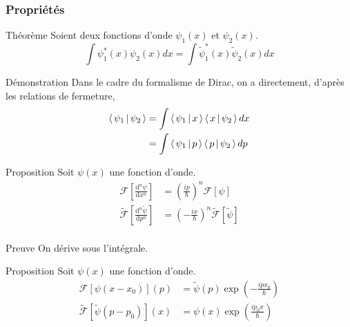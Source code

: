         \subsubsection{Propriétés}

        \begin{omed}{Théorème}
            Soient deux fonctions d’onde $\psi_1(x)$ et $\psi_2(x)$.
            \[ \int \psi_1^*(x) \psi_2(x) dx = \int \tilde{\psi}_1^*(x) \tilde{\psi}_2(x) dx \]
        \end{omed}

        \begin{demo}{Démonstration}
            Dans le cadre du formalisme de Dirac, on a directement, d’après les relations de fermeture,
            \begin{align*}
                \left< \, \psi_1 \, \middle| \, \psi_2 \, \right> &= \int \left< \, \psi_1 \, \middle| \, x \, \right> \left< \, x \, \middle| \, \psi_2 \, \right> dx \\&= \int \left< \, \psi_1 \, \middle| \, p \, \right> \left< \, p \, \middle| \, \psi_2 \, \right> dp
            \end{align*}
        \end{demo}

        \begin{omed}{Proposition}
            Soit $\psi(x)$ une fonction d’onde. 
            \begin{align*}
                \mathcal{F}\left[\frac{\text{d}^n \psi}{\text{d}x^n}\right] &= \left(\frac{ip}{\hbar}\right)^n \mathcal{F}[\psi] \\
                \tilde{\mathcal{F}}\left[\frac{\text{d}^n \tilde{\psi}}{\text{d}p^n}\right] &= \left(-\frac{ix}{\hbar}\right)^n \tilde{\mathcal{F}}[\tilde{\psi}] \\
            \end{align*}
        \end{omed}

        \begin{demo}{Preuve}
            On dérive sous l’intégrale.
        \end{demo}

        \begin{omed}{Proposition}
            Soit $\psi(x)$ une fonction d’onde. 
            \begin{align*}
                \mathcal{F}[\psi(x - x_0)](p) &= \tilde{\psi}(p)\exp\left(-\frac{i p x_0}{\hbar}\right) \\
                \tilde{\mathcal{F}}[\tilde{\psi}(p - p_0)](x) &= \psi(x)\exp\left(\frac{i p_0 x}{\hbar}\right) 
            \end{align*}
        \end{omed}


